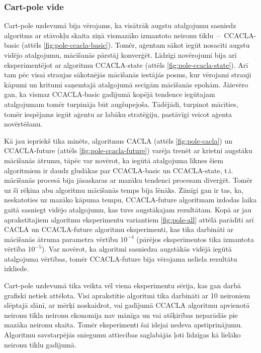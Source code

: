\documentclass{ludis} %
\begin{document}
\subsubsection{Cart-pole vide}
Cart-pole uzdevumā bija vērojams, ka visātrāk augstu atalgojumu sasniedz
algoritms ar stāvokļu skaita ziņā vismazāko izmantoto neironu
tīklu~--~CCACLA-basic (attēls \ref{fig:pole-ccacla-basic}). Tomēr, aģentam sākot
iegūt nosacīti augstu vidējo atalgojumu, mācīšanās pārstāj konverģēt. Līdzīgi
novērojumi bija arī eksperimentējot ar algoritmu CCACLA-state (attēls
\ref{fig:pole-ccacla-state}). Arī tam pēc visai straujas sākotnējās mācīšanās
iestājās posms, kur vērojami strauji kāpumi un kritumi saņemtajā atalgojumā
secīgām mācīšanās epohām. Jāievēro gan, ka vismaz CCACLA-basic gadījumā kopējā
tendence iegūtajam atalgojumam tomēr turpināja būt augšupejoša. Tādējādi,
turpinot mācīties, tomēr iespējams iegūt aģentu ar labāku stratēģiju, pastāvīgi
veicot aģenta novērtēšanu.

Kā jau iepriekš tika minēts, algoritmus CACLA (attēls \ref{fig:pole-cacla}) un
CCACLA-future (attēls \ref{fig:pole-ccacla-future}) varēja trenēt ar krietni
augstāku mācīšanās ātrumu, tāpēc var novērot, ka iegūtā atalgojuma līknes šiem
algoritmiem ir daudz gludākas par CCACLA-basic un CCACLA-state, t.i. mācīšanās
procesā bija jāsaskaras ar mazāku tendenci procesam diverģēt. Tomēr uz šī rēķina
abu algoritmu mācīšanās temps bija lēnāks. Zīmīgi gan ir tas, ka, neskatoties uz
mazāko kāpuma tempu, CCACLA-future algoritmam izdodas laika gaitā sasniegt
vidējo atalgojumu, kas tuvs augstākajam rezultātam. Kopā ar jau aprakstītajiem
algoritmu eksperimentu variantiem \ref{fig:pole-all} attēlā parādīti arī CACLA
un CCACLA-future algoritmu eksperimenti, kas tika darbināti ar mācīšanās ātruma
parametra vērtību $10^{-4}$ (pārējos eksperimentos tika izmantota vērtība
$10^{-5}$). Var novērot, ka algoritmi sasniedza augstākās vidējā iegūtā
atalgojuma vērtības, tomēr CCACLA-future bija vērojama neliela rezultātu
izkliede.

Cart-pole uzdevumā tika veikta vēl viena eksperimentu sērija, kas gan darbā
grafiski netiek attēlota. Visi aprakstītie algoritmi tika darbināti ar 10
neironiem slēptajā slānī, ar mērķi noskaidrot, vai gadījumā CCACLA algoritmu
apvienotā neironu tīkla neironu ekonomija nav mānīga un vai atšķirības neparādās
pie mazāka neironu skaita. Tomēr eksperimenti šai idejai nedeva apstiprinājumu.
Algoritmu savstarpējās sniegumu attiecības saglabājās ļoti līdzīgas kā lielāko
neironu tīklu gadījumā.
\end{document}
